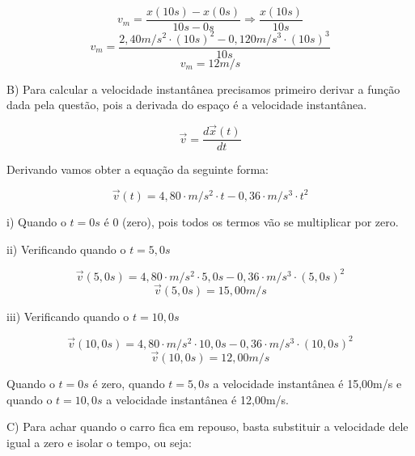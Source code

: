 \documentclass[a4paper, 12pt]{article}
\begin{document}
\begin{flushleft}
		\begin{equation*}
			v_m = \frac{x(10s) - x(0s)}{10s - 0s} \Rightarrow \frac{x(10s)}{10s}
		\end{equation*}
		\begin{equation*}
			v_m = \frac{2,40m/s^2 \cdot (10s)^2 - 0,120m/s^3 \cdot (10s)^3}{10s}
		\end{equation*}
		\begin{equation*}
			v_m = 12m/s
		\end{equation*}
		
		B) Para calcular a velocidade instantânea precisamos primeiro derivar a função dada pela questão, pois a derivada do espaço é a velocidade instantânea.
		
		\begin{equation*}
			\vec{v} = \dfrac{d\vec{x}(t)}{dt}
		\end{equation*}
		
		Derivando vamos obter a equação da seguinte forma:
		
		\begin{equation*}
			\vec{v}(t) = 4,80 \cdot m/s^2 \cdot t - 0,36 \cdot m/s^3 \cdot t^2
		\end{equation*}
		
		i) Quando o $t=0s$ é 0 (zero), pois todos os termos vão se multiplicar por zero.
		
		ii) Verificando quando o $t=5,0s$
		
		\begin{equation*}
			\vec{v}(5,0s) = 4,80 \cdot m/s^2 \cdot 5,0s - 0,36 \cdot m/s^3 \cdot (5,0s)^2
		\end{equation*}
		\begin{equation*}
			\vec{v}(5,0s) = 15,00 m/s
		\end{equation*}
		
		iii) Verificando quando o $t=10,0s$
		
		\begin{equation*}
			\vec{v}(10,0s) = 4,80 \cdot m/s^2 \cdot 10,0s - 0,36 \cdot m/s^3 \cdot (10,0s)^2
		\end{equation*}
		\begin{equation*}
			\vec{v}(10,0s) = 12,00 m/s
		\end{equation*}
		
		Quando o $t=0s$ é zero, quando $t=5,0s$ a velocidade instantânea é  15,00m/s e quando o $t=10,0s$ a velocidade instantânea é 12,00m/s.
		
		C) Para achar quando o carro fica em repouso, basta substituir a velocidade dele igual a zero e isolar o tempo, ou seja:
		

\end{flushleft}
\end{document}
